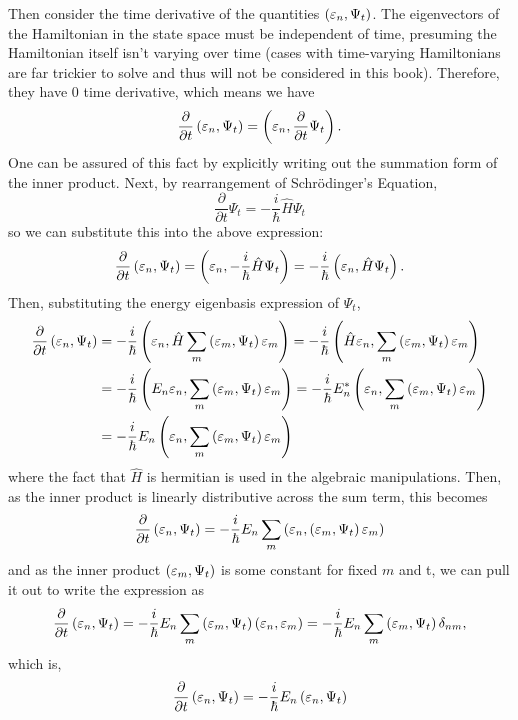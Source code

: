 Then consider the time derivative of the quantities $\left(\varepsilon_{n},\Psi_{t}\right)$. The eigenvectors of the Hamiltonian in the state space must be independent of time, presuming the Hamiltonian itself isn't varying over time (cases with time-varying Hamiltonians are far trickier to solve and thus will not be considered in this book). Therefore, they have 0 time derivative, which means we have
$$
\frac{\partial}{\partial t}\left(\varepsilon_{n},\Psi_{t}\right)=\left(\varepsilon_{n},\frac{\partial}{\partial t}\Psi_{t}\right).
$$
One can be assured of this fact by explicitly writing out the summation form of the inner product. Next, by rearrangement of Schr\"{o}dinger's Equation, 
$$
\frac{\partial}{\partial t}\Psi_{t}=-\frac{i}{\hbar}\hat{H}\Psi_{t}
$$
so we can substitute this into the above expression:
$$
\frac{\partial}{\partial t}\left(\varepsilon_{n},\Psi_{t}\right)=\left(\varepsilon_{n},-\frac{i}{\hbar}\hat{H}\Psi_{t}\right)=-\frac{i}{\hbar}\left(\varepsilon_{n},\hat{H}\Psi_{t}\right).
$$ 
Then, substituting the energy eigenbasis expression of $\Psi_{t}$,
$$
\begin{aligned}
\frac{\partial}{\partial t}\left(\varepsilon_{n},\Psi_{t}\right)&=-\frac{i}{\hbar}\left(\varepsilon_{n},\hat{H}\sum_{m}\left(\varepsilon_{m},\Psi_{t}\right)\varepsilon_{m}\right) =-\frac{i}{\hbar}\left(\hat{H}\varepsilon_{n},\sum_{m}\left(\varepsilon_{m},\Psi_{t}\right)\varepsilon_{m}\right)\\
&=-\frac{i}{\hbar}\left(E_{n}\varepsilon_{n},\sum_{m}\left(\varepsilon_{m},\Psi_{t}\right)\varepsilon_{m}\right)
=-\frac{i}{\hbar}E^{\ast}_{n}\left(\varepsilon_{n},\sum_{m}\left(\varepsilon_{m},\Psi_{t}\right)\varepsilon_{m}\right)\\
&=-\frac{i}{\hbar}E_{n}\left(\varepsilon_{n},\sum_{m}\left(\varepsilon_{m},\Psi_{t}\right)\varepsilon_{m}\right)
\end{aligned}
$$
where the fact that $\hat{H}$ is hermitian is used in the algebraic manipulations. Then, as the inner product is linearly distributive across the sum term, this becomes
$$
\frac{\partial}{\partial t}\left(\varepsilon_{n},\Psi_{t}\right)=-\frac{i}{\hbar}E_{n}\sum_{m}\left(\varepsilon_{n},\left(\varepsilon_{m},\Psi_{t}\right)\varepsilon_{m}\right)
$$
and as the inner product $\left(\varepsilon_{m},\Psi_{t}\right)$ is some constant for fixed $m$ and t, we can pull it out to write the expression as
$$
\frac{\partial}{\partial t}\left(\varepsilon_{n},\Psi_{t}\right)=-\frac{i}{\hbar}E_{n}\sum_{m}\left(\varepsilon_{m},\Psi_{t}\right)\left(\varepsilon_{n},\varepsilon_{m}\right)=-\frac{i}{\hbar}E_{n}\sum_{m}\left(\varepsilon_{m},\Psi_{t}\right)\delta_{nm},
$$
which is,
$$
\frac{\partial}{\partial t}\left(\varepsilon_{n},\Psi_{t}\right)=-\frac{i}{\hbar}E_{n}\left(\varepsilon_{n},\Psi_{t}\right)
$$
